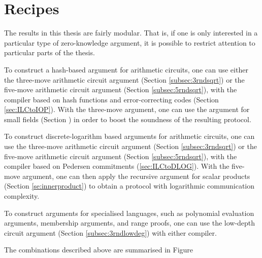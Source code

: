 %

\section{Recipes} The results in this thesis are fairly modular. That is, if one is only interested in a particular type of zero-knowledge argument, it is possible to restrict attention to particular parts of the thesis.

To construct a hash-based argument for arithmetic circuits, one can use either the three-move arithmetic circuit argument (Section \ref{subsec:3rndsqrt}) or the five-move arithmetic circuit argument (Section \ref{subsec:5rndsqrt}), with the compiler based on hash functions and error-correcting codes (Section \ref{sec:ILCtoIOP}). With the three-move argument, one can use the argument for small fields (Section \label{sec:fieldext}) in order to boost the soundness of the resulting protocol.

To construct discrete-logarithm based arguments for arithmetic circuits, one can use the three-move arithmetic circuit argument (Section \ref{subsec:3rndsqrt}) or the five-move arithmetic circuit argument (Section \ref{subsec:5rndsqrt}), with the compiler based on Pedersen commitments (\ref{sec:ILCtoDLOG}). With the five-move argument, one can then apply the recursive argument for scalar products (Section \ref{se:innerproduct}) to obtain a protocol with logarithmic communication complexity.

To construct arguments for specialised languages, such as polynomial evaluation arguments, membership arguments, and range proofs, one can use the low-depth circuit argument (Section \ref{subsec:3rndlowdeg}) with either compiler.

The combinations described above are summarised in Figure

